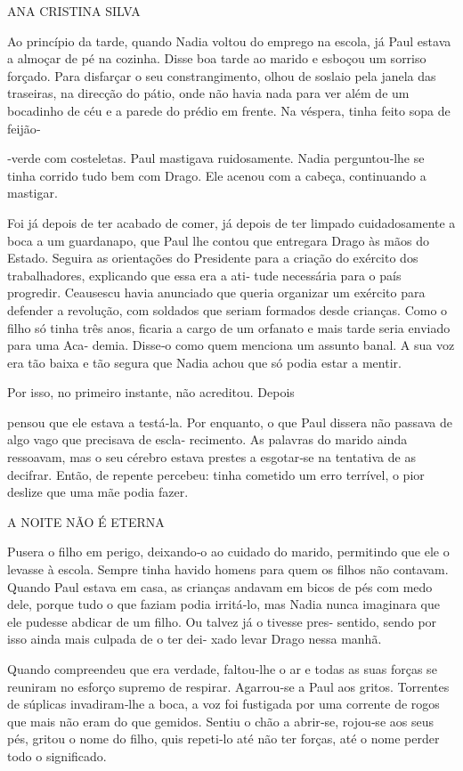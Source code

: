 ANA CRISTINA SILVA

Ao princípio da tarde, quando Nadia voltou do emprego na escola, já Paul
estava a almoçar de pé na cozinha. Disse boa tarde ao marido e esboçou
um sorriso forçado. Para disfarçar o seu constrangimento, olhou de
soslaio pela janela das traseiras, na direcção do pátio, onde não havia
nada para ver além de um bocadinho de céu e a parede do prédio em
frente. Na véspera, tinha feito sopa de feijão‑

‑verde com costeletas. Paul mastigava ruidosamente. Nadia perguntou‑lhe
se tinha corrido tudo bem com Drago. Ele acenou com a cabeça,
continuando a mastigar.

Foi já depois de ter acabado de comer, já depois de ter limpado
cuidadosamente a boca a um guardanapo, que Paul lhe contou que entregara
Drago às mãos do Estado. Seguira as orientações do Presidente para a
criação do exército dos trabalhadores, explicando que essa era a ati‑
tude necessária para o país progredir. Ceausescu havia anunciado que
queria organizar um exército para defender a revolução, com soldados que
seriam formados desde crianças. Como o filho só tinha três anos, ficaria
a cargo de um orfanato e mais tarde seria enviado para uma Aca‑ demia.
Disse‑o como quem menciona um assunto banal. A sua voz era tão baixa e
tão segura que Nadia achou que só podia estar a mentir.

Por isso, no primeiro instante, não acreditou. Depois

pensou que ele estava a testá‑la. Por enquanto, o que Paul dissera não
passava de algo vago que precisava de escla‑ recimento. As palavras do
marido ainda ressoavam, mas o seu cérebro estava prestes a esgotar‑se na
tentativa de as decifrar. Então, de repente percebeu: tinha cometido um
erro terrível, o pior deslize que uma mãe podia fazer.

A NOITE NÃO É ETERNA

Pusera o filho em perigo, deixando‑o ao cuidado do marido, permitindo
que ele o levasse à escola. Sempre tinha havido homens para quem os
filhos não contavam. Quando Paul estava em casa, as crianças andavam em
bicos de pés com medo dele, porque tudo o que faziam podia irritá‑lo,
mas Nadia nunca imaginara que ele pudesse abdicar de um filho. Ou talvez
já o tivesse pres‑ sentido, sendo por isso ainda mais culpada de o ter
dei‑ xado levar Drago nessa manhã.

Quando compreendeu que era verdade, faltou‑lhe o ar e todas as suas
forças se reuniram no esforço supremo de respirar. Agarrou‑se a Paul aos
gritos. Torrentes de súplicas invadiram‑lhe a boca, a voz foi fustigada
por uma corrente de rogos que mais não eram do que gemidos. Sentiu o
chão a abrir‑se, rojou‑se aos seus pés, gritou o nome do filho, quis
repeti‑lo até não ter forças, até o nome perder todo o significado.

